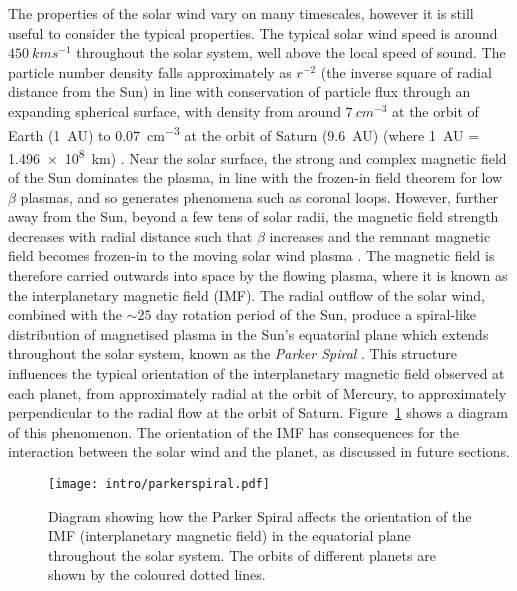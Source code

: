 The properties of the solar wind vary on many timescales, however it is still useful to consider the typical properties. The typical solar wind speed is around $\SI{450}{kms^{-1}}$ throughout the solar system, well above the local speed of sound. The particle number density falls approximately as $r^{-2}$ (the inverse square of radial distance from the Sun) in line with conservation of particle flux through an expanding spherical surface, with density from around $\SI{7}{cm^{-3}}$ at the orbit of Earth (\SI{1}{AU}) to \SI{0.07}{cm^{-3}} at the orbit of Saturn (\SI{9.6}{AU}) (where \SI{1}{AU} = \SI{1.496e8}{km}) \citep{bagenal2014} . Near the solar surface, the strong and complex magnetic field of the Sun dominates the plasma, in line with the frozen-in field theorem for low $\beta$ plasmas, and so generates phenomena such as coronal loops. However, further away from the Sun, beyond a few tens of solar radii, the magnetic field strength decreases with radial distance such that $\beta$ increases and the remnant magnetic field becomes frozen-in to the moving  solar wind plasma \citep{russell2016}. The magnetic field is therefore carried outwards into space by the flowing plasma, where it is known as the interplanetary magnetic field (IMF). The radial outflow of the solar wind, combined with the ${\sim}25$ day rotation period of the Sun, produce a spiral-like distribution of magnetised plasma in the Sun's equatorial plane which extends throughout the solar system, known as the \textit{Parker Spiral} \citep{parker1958}. This structure influences the typical orientation of the interplanetary magnetic field observed at each planet, from approximately radial at the orbit of Mercury, to approximately perpendicular to the radial flow at the orbit of Saturn. Figure~\ref{intro:fig:parkerspiral} shows a diagram of this phenomenon. The orientation of the IMF has consequences for the interaction between the solar wind and the planet, as discussed in future sections.

\begin{figure}
\centering
\noindent\texttt{[image: intro/parkerspiral.pdf]}
\caption[Diagram of the Parker Spiral throughout the solar system.]{Diagram showing how the Parker Spiral affects the orientation of the IMF (interplanetary magnetic field) in the equatorial plane throughout the solar system. The orbits of different planets are shown by the coloured dotted lines.}
\label{intro:fig:parkerspiral}
\end{figure}

